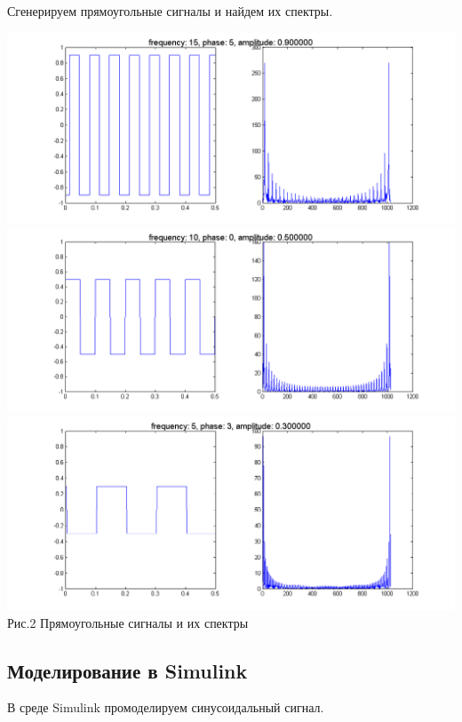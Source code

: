 \documentclass[a4paper]{article}
\begin{document}
\newpage

Сгенерируем прямоугольные сигналы и найдем их спектры.



\begin{center}
	\includegraphics[scale = 0.5]{square1.png}
	\includegraphics[scale = 0.5]{square2.png}
	\includegraphics[scale = 0.5]{square3.png} \\ Рис.2 Прямоугольные сигналы и их спектры 
\end{center}

\subsection{Моделирование в Simulink}

В среде Simulink промоделируем синусоидальный сигнал.
\end{document}
